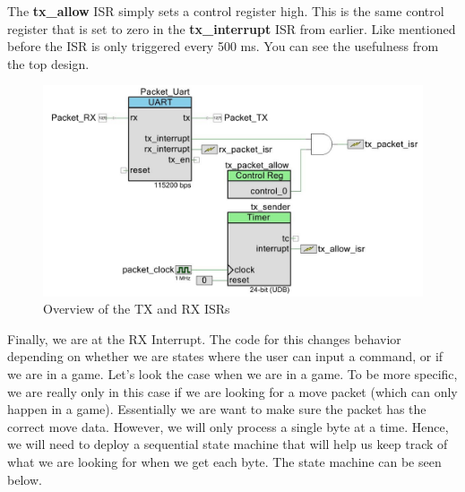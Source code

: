 \documentclass[a4paper, 12pt]{article}
\begin{document}
    The \textbf{tx\_allow} ISR simply sets a control register high. This is
    the same control register that is set to zero in the \textbf{tx\_interrupt}
    ISR from earlier. Like mentioned before the ISR is only triggered every
    500 ms. You can see the usefulness from the top design.

    \begin{figure}[H]
        \centering
        \includegraphics[scale=0.6]{pics/packet_com}
        \caption{Overview of the TX and RX ISRs}
        \label{fig:TXRXSetup}
    \end{figure}

    Finally, we are at the RX Interrupt. The code for this changes behavior
    depending on whether we are states where the user can input a command, or
    if we are in a game. Let's look the case when we are in a game. To be more
    specific, we are really only in this case if we are looking for a move packet
    (which can only happen in a game). Essentially we are want to make
    sure the packet has the correct move data. However, we will only
    process a single byte at a time. Hence, we will need to deploy a
    sequential state machine that will help us keep track of what we are looking
    for when we get each byte. The state machine can be seen below.
\end{document}
